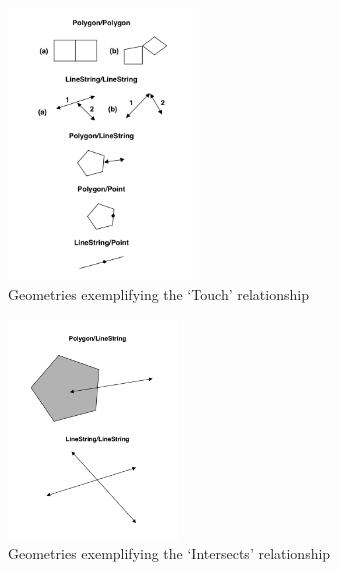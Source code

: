 \begin{figure}
    \centering

    \includegraphics[width=0.45\textwidth]{figures/touches.png}
    
    \caption{Geometries exemplifying the `Touch' relationship}
    \label{fig:touches}
    
\end{figure}

\begin{figure}
    \centering

    \includegraphics[width=0.4\textwidth]{figures/crosses.png}
    
    \caption{Geometries exemplifying the `Intersects' relationship}
    \label{fig:intersects}
    
\end{figure}


